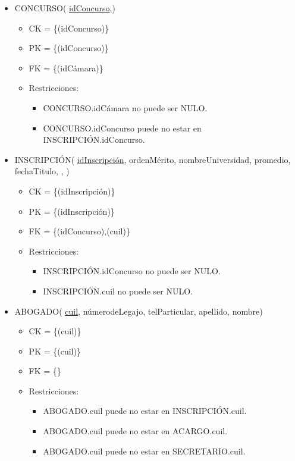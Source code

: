 \begin{itemize}
	
\item CONCURSO( \underline{idConcurso},)
	\begin{itemize}
		\item CK = \{(idConcurso)\}
		\item PK = \{(idConcurso)\}
		\item FK = \{(idCámara)\}
		\item Restricciones:
			\begin{itemize}
			\item CONCURSO.idCámara no puede ser NULO.
			\item CONCURSO.idConcurso puede no estar en INSCRIPCIÓN.idConcurso.
			\\			
			\end{itemize}		
	\end{itemize}
	
	
\item INSCRIPCIÓN( \underline{idInscripción}, ordenMérito, nombreUniversidad, promedio, fechaTitulo, , )
	\begin{itemize}
		\item CK = \{(idInscripción)\}
		\item PK = \{(idInscripción)\}
		\item FK = \{(idConcurso),(cuil)\}
		\item Restricciones:
			\begin{itemize}
			\item INSCRIPCIÓN.idConcurso no puede ser NULO.
			\item INSCRIPCIÓN.cuil no puede ser NULO.
			\\
			\end{itemize}
	\end{itemize}
	
	
\item ABOGADO( \underline{cuil}, númerodeLegajo, telParticular, apellido, nombre)
	\begin{itemize}
		\item CK = \{(cuil)\}
		\item PK = \{(cuil)\}
		\item FK = \{\}
		\item Restricciones:
			\begin{itemize}
			\item ABOGADO.cuil puede no estar en INSCRIPCIÓN.cuil.
			\item ABOGADO.cuil puede no estar en ACARGO.cuil.
			\item ABOGADO.cuil puede no estar en SECRETARIO.cuil.
			\\
			\end{itemize}
	\end{itemize}


\end{itemize}
